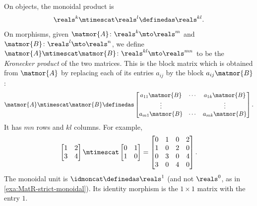 \begin{example}
    On objects, the monoidal product is
    \begin{equation}
        \reals^k \mtimescat \reals^l \definedas \reals^{kl}.
    \end{equation}
    On morphisms, given $\matmor{A} \colon \reals^k \mto \reals^m$ and $\matmor{B} \colon \reals^l \mto \reals^n$, we define $\matmor{A} \mtimescat \matmor{B} \colon \reals^{kl} \mto \reals^{mn}$ to be the \emph{Kronecker product} of the two matrices.
    This is the block matrix which is obtained from $\matmor{A}$ by replacing each of its entries $a_{ij}$ by the block $a_{ij}\matmor{B}$:
    \begin{equation}
        \label{eq:MatR-Kronecker-product}
        \matmor{A} \mtimescat \matmor{B} \definedas
        \begin{bmatrix}
            a_{11}\matmor{B} & \cdots & a_{1k}\matmor{B} \\
            \vdots           &        & \vdots           \\
            a_{m1}\matmor{B} & \cdots & a_{mk}\matmor{B}
        \end{bmatrix}.
    \end{equation}
    It has $mn$ rows and $kl$ columns.
    For example,
    \begin{equation}
        \begin{bmatrix}
            1 & 2 \\
            3 & 4
        \end{bmatrix}
        \mtimescat
        \begin{bmatrix}
            0 & 1 \\
            1 & 0
        \end{bmatrix}
        =
        \begin{bmatrix}
            0 & 1 & 0 & 2 \\
            1 & 0 & 2 & 0 \\
            0 & 3 & 0 & 4 \\
            3 & 0 & 4 & 0
        \end{bmatrix}.
    \end{equation}
    The monoidal unit is $\idmoncat \definedas \reals^1$ (and not $\reals^0$, as in \cref{exa:MatR-strict-monoidal}).
    Its identity morphism is the $1 \times 1$ matrix with the entry $1$.


\end{example}
